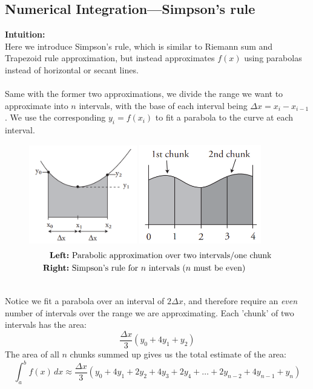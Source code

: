 \documentclass{report}
\begin{document}
\subsection{Numerical Integration---Simpson's rule} %
\textbf{Intuition:}\\
Here we introduce Simpson's rule, which is similar to Riemann sum and Trapezoid rule 
approximation, but instead approximates $f(x)$ using parabolas instead of horizontal
or secant lines.\\
\vspace{1mm}\\
Same with the former two approximations, we divide the range we want to approximate 
into $n$ intervals, with the base of each interval being $\Delta x=x_i-x_{i-1}$.
We use the corresponding $y_i=f(x_i)$ to fit a parabola to the curve at each interval.	
\begin{figure}[h]
\includegraphics[width=4.7cm]{Capture36}
\includegraphics[width=5.3cm]{Capture37}\\
\centering
\begin{align*}
\text{\textbf{Left:}}&\text{ Parabolic approximation over two intervals/one chunk}\\
\text{\textbf{Right:}}&\text{ Simpson's rule for $n$ intervals ($n$ must be even)}
\end{align*}
\end{figure}\\
Notice we fit a parabola over an interval of $2\Delta x$, and therefore
require an \textit{even} number of intervals over the range we are approximating. Each 'chunk' of two intervals has the area:
\begin{equation*}
\frac{\Delta x}{3}(y_0+4y_1+y_2)
\end{equation*}
The area of all $n$ chunks summed up gives us the total estimate of the area:
\begin{equation*}
\int_a^bf(x)\,dx\approx \frac{\Delta x}{3}(y_0+4y_1+2y_2
+4y_3+2y_4+\ldots+2y_{n-2}+4y_{n-1}+y_n) 
\end{equation*}
\newpage
\end{document}
